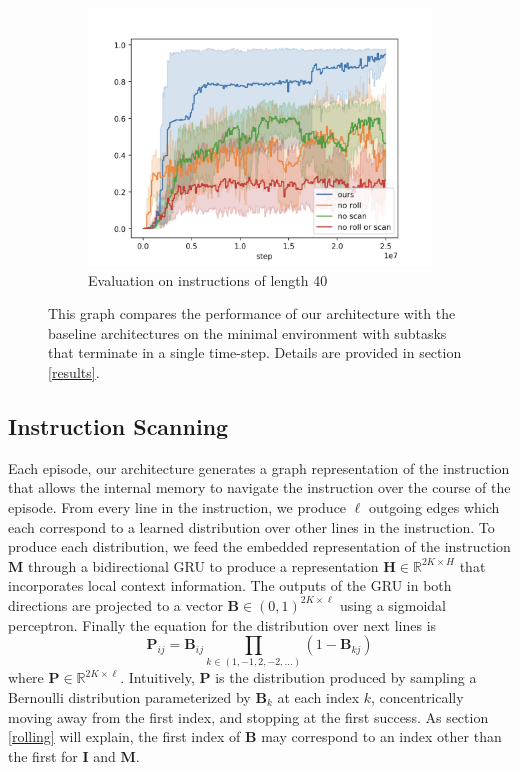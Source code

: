 \documentclass{article}
\begin{document}
\begin{figure}[th]
\begin{subfigure}{.33\textwidth}
    \centerline{\includegraphics[width=\columnwidth]{figures/eval40}}
    \caption{Evaluation on instructions of length 40}
  \end{subfigure}%
  \caption{This graph compares the performance of our architecture with the
baseline architectures on the minimal environment with subtasks that terminate
in a single time-step.
Details are provided in section \ref{results}.}
  \label{minimal}
\end{figure}

\subsection{Instruction Scanning}\label{scanning}
Each episode, our architecture generates a graph representation of the
instruction that allows the internal memory to navigate the instruction over the
course of the episode.  From every line in the instruction, we produce
$\ell$ outgoing edges which each correspond to a learned distribution over other lines
in the instruction. To produce each distribution, we feed the embedded representation
of the instruction $\mathbf{M}$ through a bidirectional GRU to produce a
representation $\mathbf{H} \in \mathbb{R}^{2K \times H}$ 
that incorporates local context information. The outputs of the GRU in both
directions are projected to a vector $\mathbf{B} \in (0, 1)^{2K\times \ell
 }$ using a sigmoidal
perceptron. Finally the equation for the distribution over next lines is
\begin{equation}
  \label{P}
  \mathbf{P}_{ij} = \mathbf{B}_{ij}\prod_{k \in (1, -1, 2, -2, \dots)}\left(1 -
  \mathbf{B}_{kj}\right)
\end{equation}
where $\mathbf{P} \in \mathbb{R}^{2K\times\ell }$. Intuitively, $\mathbf{P}$ is the distribution produced by
sampling a Bernoulli distribution parameterized by $\mathbf{B}_k$ at each index
$k$, concentrically moving away from the first index, and stopping at the first success.
As section \ref{rolling} will explain, the first index of $\mathbf{B}$ may
correspond to an index other than the first for $\mathbf{I}$ and $\mathbf{M}$.
\end{document}
